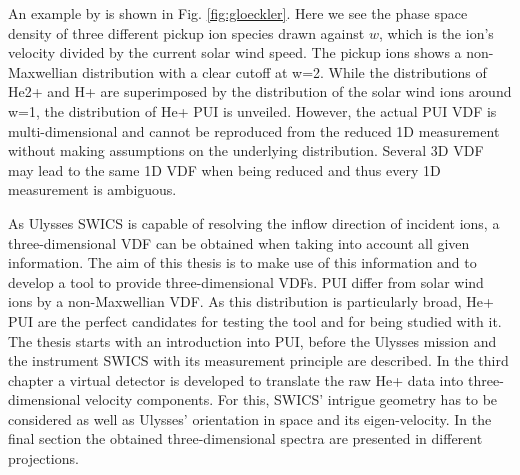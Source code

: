 An example by \citet{gloeckler1999} is shown in Fig. \ref{fig:gloeckler}. Here we see the phase space density of three different pickup ion species drawn against $w$, which is the ion's velocity divided by the current solar wind speed. The pickup ions shows a non-Maxwellian distribution with a clear cutoff at w=2. While the distributions of He2+ and H+ are superimposed by the distribution of the solar wind ions around w=1, the distribution of He+ PUI is unveiled.  
However, the actual PUI VDF is multi-dimensional and cannot be reproduced from the reduced 1D measurement without making assumptions on the underlying distribution.
Several 3D VDF may lead to the same 1D VDF when being reduced and thus every 1D measurement is ambiguous.

As Ulysses SWICS is capable of resolving the inflow direction of incident ions, a three-dimensional VDF can be obtained when taking into account all given information.
The aim of this thesis is to make use of this information and to develop a tool to provide three-dimensional VDFs. 
PUI differ from solar wind ions by a non-Maxwellian VDF. As this distribution is particularly broad, He+ PUI are the perfect candidates for testing the tool and for being studied with it.
\\
The thesis starts with an introduction into PUI, before the Ulysses mission and the instrument SWICS with its measurement principle are described. In the third chapter a virtual detector is developed to translate the raw He+ data into three-dimensional velocity components. For this, SWICS' intrigue geometry has to be considered as well as Ulysses' orientation in space and its eigen-velocity. In the final section the obtained three-dimensional spectra are presented in different projections.



